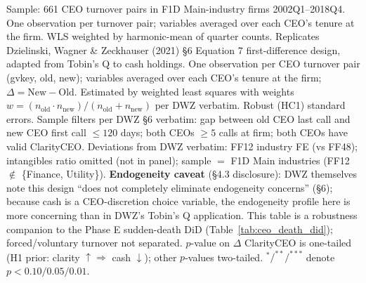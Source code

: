 \begin{table}[!htbp]
\begin{tablenotes}\footnotesize\item Sample: 661 CEO turnover pairs in F1D Main-industry firms 2002Q1--2018Q4. One observation per turnover pair; variables averaged over each CEO's tenure at the firm. WLS weighted by harmonic-mean of quarter counts.  Replicates Dzielinski, Wagner \& Zeckhauser (2021) \S 6 Equation 7 first-difference design, adapted from Tobin's Q to cash holdings. One observation per CEO turnover pair (gvkey, old, new); variables averaged over each CEO's tenure at the firm; $\Delta = \text{New} - \text{Old}$. Estimated by weighted least squares with weights $w = (n_{\text{old}} \cdot n_{\text{new}}) / (n_{\text{old}} + n_{\text{new}})$ per DWZ verbatim. Robust (HC1) standard errors. Sample filters per DWZ \S 6 verbatim: gap between old CEO last call and new CEO first call $\leq 120$ days; both CEOs $\geq 5$ calls at firm; both CEOs have valid ClarityCEO. Deviations from DWZ verbatim: FF12 industry FE (vs FF48); intangibles ratio omitted (not in panel); sample $=$ F1D Main industries (FF12 $\notin$ \{Finance, Utility\}). \textbf{Endogeneity caveat} (\S 4.3 disclosure): DWZ themselves note this design ``does not completely eliminate endogeneity concerns'' (\S 6); because cash is a CEO-discretion choice variable, the endogeneity profile here is more concerning than in DWZ's Tobin's Q application. This table is a robustness companion to the Phase E sudden-death DiD (Table~\ref{tab:ceo_death_did}); forced/voluntary turnover not separated. $p$-value on $\Delta$ ClarityCEO is one-tailed (H1 prior: clarity $\uparrow \Rightarrow$ cash $\downarrow$); other $p$-values two-tailed. $^{*}/^{**}/^{***}$ denote $p<0.10/0.05/0.01$.\end{tablenotes}
\end{table}
